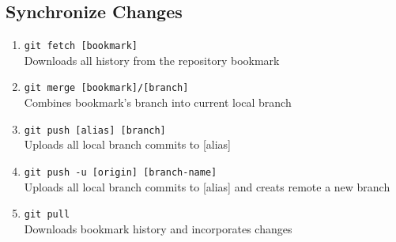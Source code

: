\documentclass[a4paper, twoside, 11pt]{extarticle}
\newenvironment{enumx} {
    \begin{enumerate}[leftmargin=*]
    \setlength{\topsep}{0pt}
    \setlength{\itemsep}{0pt}
    \setlength{\parskip}{0pt}
    \setlength{\parsep}{0pt}
    }
{\end{enumerate}}
\begin{document}
\begin{multicols}{3}
\subsection{Synchronize Changes}
\begin{enumx}
    \item \texttt{git fetch [bookmark]}\\
    Downloads all history from the repository bookmark
    \item \texttt{git merge [bookmark]/[branch]}\\
    Combines bookmark’s branch into current local branch
    \item \texttt{git push [alias] [branch]}\\
    Uploads all local branch commits to [alias]
    \item \texttt{git push -u [origin] [branch-name]}\\
    Uploads all local branch commits to [alias] and creats remote a new branch
    \item \texttt{git pull}\\
    Downloads bookmark history and incorporates changes
\end{enumx}
\end{multicols}
\end{document}
